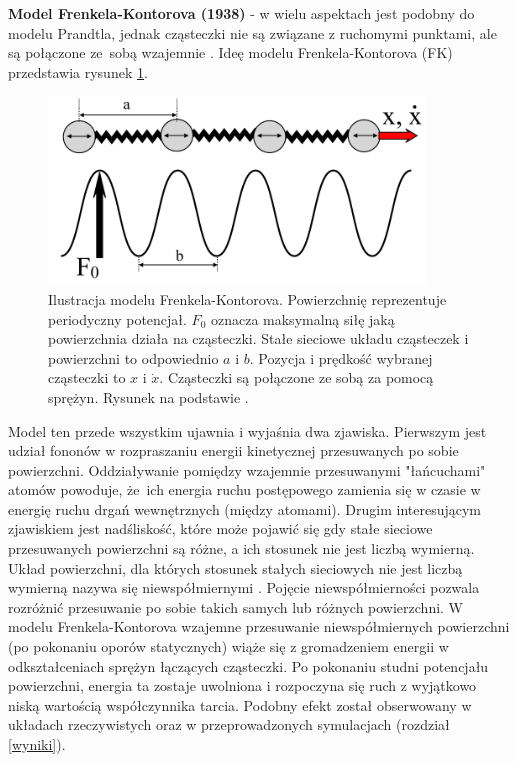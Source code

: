 \documentclass[12pt,a4paper,openright]{report} %
\begin{document}
\textbf{Model Frenkela-Kontorova (1938)} - w wielu aspektach jest podobny do modelu Prandtla, jednak cząsteczki nie są związane z ruchomymi punktami, ale są połączone ze~sobą wzajemnie  \cite{SpringerHandbook, Frenkel1938}. Ideę modelu Frenkela-Kontorova (FK) przedstawia rysunek \ref{FKmodel}. 
\begin{figure}[h!]
\centering
\includegraphics[width=10cm, clip]{rysunki/FKmodel.pdf}
\caption{Ilustracja modelu Frenkela-Kontorova. Powierzchnię reprezentuje periodyczny potencjał. $F_0$ oznacza maksymalną siłę jaką powierzchnia działa na cząsteczki. Stałe sieciowe układu cząsteczek i powierzchni to odpowiednio $a$ i $b$. Pozycja i prędkość wybranej cząsteczki to $x$ i $\dot{x}$. Cząsteczki są połączone ze sobą za pomocą sprężyn. Rysunek na podstawie \cite{SpringerHandbook}.}
\label{FKmodel}
\end{figure}
Model ten przede wszystkim ujawnia i wyjaśnia dwa zjawiska. Pierwszym jest udział fononów w rozpraszaniu energii kinetycznej przesuwanych po sobie powierzchni. Oddziaływanie pomiędzy wzajemnie przesuwanymi "łańcuchami" atomów powoduje, że~ich energia ruchu postępowego zamienia się w czasie w energię ruchu drgań wewnętrznych (między atomami). Drugim interesującym zjawiskiem jest nadśliskość, które może pojawić się gdy stałe sieciowe przesuwanych powierzchni są różne, a ich stosunek nie jest liczbą wymierną. Układ powierzchni, dla których stosunek stałych sieciowych nie jest liczbą wymierną nazywa się niewspółmiernymi \cite{SpringerHandbook}. Pojęcie niewspółmierności pozwala rozróżnić przesuwanie po sobie takich samych lub różnych powierzchni. W modelu Frenkela-Kontorova wzajemne przesuwanie niewspółmiernych powierzchni (po pokonaniu oporów statycznych) wiąże się z gromadzeniem energii w odkształceniach sprężyn łączących cząsteczki. Po pokonaniu studni potencjału powierzchni, energia ta zostaje uwolniona i rozpoczyna się ruch z wyjątkowo niską wartością współczynnika tarcia. Podobny efekt został obserwowany w układach rzeczywistych \cite{SpringerHandbook, Krim2002} oraz w przeprowadzonych symulacjach (rozdział \ref{wyniki}).   
%
\end{document}
